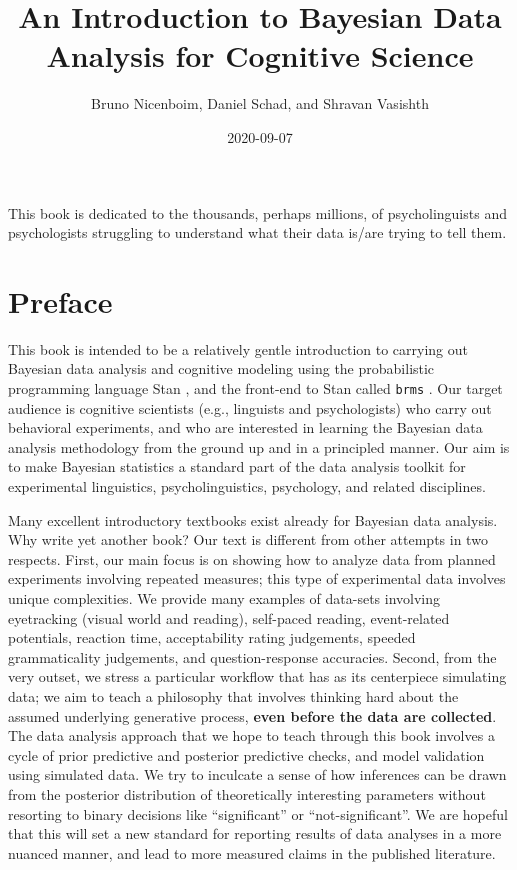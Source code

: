 \documentclass[12pt,]{krantz}
\title{An Introduction to Bayesian Data Analysis for Cognitive Science}
\author{Bruno Nicenboim, Daniel Schad, and Shravan Vasishth}
\date{2020-09-07}
\theoremstyle{definition}
\theoremstyle{definition}
\theoremstyle{definition}
\theoremstyle{remark}
\begin{document}
\maketitle

\thispagestyle{empty}
\begin{center}
This book is dedicated to the thousands, perhaps millions, of psycholinguists and psychologists struggling to understand what their data is/are trying to tell them.
\end{center}

\setlength{\abovedisplayskip}{-5pt}
\setlength{\abovedisplayshortskip}{-5pt}

{
\hypersetup{linkcolor=black}
\setcounter{tocdepth}{2}
\tableofcontents
}
\chapter*{Preface}\label{preface}


This book is intended to be a relatively gentle introduction to carrying
out Bayesian data analysis and cognitive modeling using the
probabilistic programming language Stan \citep{carpenter2017stan}, and
the front-end to Stan called \texttt{brms} \citep{R-brms}. Our target
audience is cognitive scientists (e.g., linguists and psychologists) who
carry out behavioral experiments, and who are interested in learning the
Bayesian data analysis methodology from the ground up and in a
principled manner. Our aim is to make Bayesian statistics a standard
part of the data analysis toolkit for experimental linguistics,
psycholinguistics, psychology, and related disciplines.

Many excellent introductory textbooks exist already for Bayesian data
analysis. Why write yet another book? Our text is different from other
attempts in two respects. First, our main focus is on showing how to
analyze data from planned experiments involving repeated measures; this
type of experimental data involves unique complexities. We provide many
examples of data-sets involving eyetracking (visual world and reading),
self-paced reading, event-related potentials, reaction time,
acceptability rating judgements, speeded grammaticality judgements, and
question-response accuracies. Second, from the very outset, we stress a
particular workflow that has as its centerpiece simulating data; we aim
to teach a philosophy that involves thinking hard about the assumed
underlying generative process, \textbf{even before the data are
collected}. The data analysis approach that we hope to teach through
this book involves a cycle of prior predictive and posterior predictive
checks, and model validation using simulated data. We try to inculcate a
sense of how inferences can be drawn from the posterior distribution of
theoretically interesting parameters without resorting to binary
decisions like ``significant'' or ``not-significant''. We are hopeful
that this will set a new standard for reporting results of data analyses
in a more nuanced manner, and lead to more measured claims in the
published literature.
\end{document}

